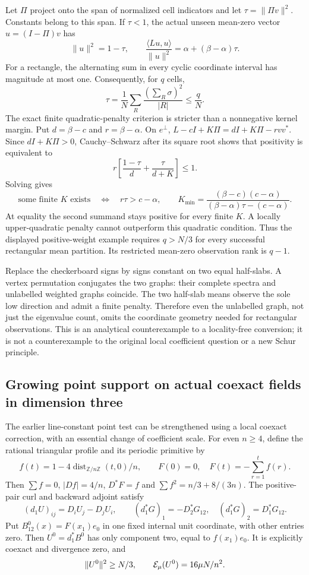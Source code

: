 Let $\Pi$ project onto the span of normalized cell indicators and let
$\tau=\|\Pi v\|^2$. Constants belong to this span. If $\tau<1$, the actual
unseen mean-zero vector $u=(I-\Pi)v$ has
\[
 \|u\|^2=1-\tau,\qquad
 \frac{\langle Lu,u\rangle}{\|u\|^2}
       =\alpha+(\beta-\alpha)\tau.
\]
For a rectangle, the alternating sum in every cyclic coordinate interval
has magnitude at most one. Consequently, for $q$ cells,
\[
 \tau=\frac1N\sum_R\frac{(\sum_R\sigma)^2}{|R|}\leq\frac qN.
\]
The exact finite quadratic-penalty criterion is stricter than a nonnegative
kernel margin. Put $d=\beta-c$ and $r=\beta-\alpha$. On $e^\perp$,
$L-cI+K\Pi=dI+K\Pi-rvv^*$. Since $dI+K\Pi>0$, Cauchy--Schwarz after
its square root shows that positivity is equivalent to
\[
 r\left[\frac{1-\tau}{d}+\frac\tau{d+K}\right]\leq1.
\]
Solving gives
\[
 \text{some finite }K\text{ exists}\quad\Longleftrightarrow\quad
 r\tau>c-\alpha,
 \qquad
 K_{\min}=\frac{(\beta-c)(c-\alpha)}{(\beta-\alpha)\tau-(c-\alpha)}.
\]
At equality the second summand stays positive for every finite $K$.
A locally upper-quadratic penalty cannot outperform this quadratic
condition. Thus the displayed positive-weight example requires $q>N/3$
for every successful rectangular mean partition. Its restricted mean-zero
observation rank is $q-1$.

Replace the checkerboard signs by signs constant on two equal half-slabs.
A vertex permutation conjugates the two graphs: their complete spectra
and unlabelled weighted graphs coincide. The two half-slab means observe
the sole low direction and admit a finite penalty. Therefore even the
unlabelled graph, not just the eigenvalue count, omits the coordinate
geometry needed for rectangular observations. This is an analytical
counterexample to a locality-free conversion; it is not a counterexample
to the original local coefficient question or a new Schur principle.

\subsection{Growing point support on actual coexact fields in dimension three}
The earlier line-constant point test can be strengthened using a local
coexact correction, with an essential change of coefficient scale.
For even $n\geq4$, define the rational triangular profile and its periodic
primitive by
\[
 f(t)=1-4\operatorname{dist}_{\mathbb Z/n\mathbb Z}(t,0)/n,
 \qquad F(0)=0,\quad F(t)=-\sum_{r=1}^t f(r).
\]
Then $\sum f=0$, $|D f|=4/n$, $D^*F=f$ and
$\sum f^2=n/3+8/(3n)$. The positive-pair curl and backward adjoint satisfy
\[
 (d_1U)_{ij}=D_iU_j-D_jU_i,\qquad
 (d_1^*G)_1=-D_2^*G_{12},\quad (d_1^*G)_2=D_1^*G_{12}.
\]
Put $B^0_{12}(x)=F(x_1)e_0$ in one fixed internal unit coordinate, with
other entries zero. Then $U^0=d_1^*B^0$ has only component two, equal to
$f(x_1)e_0$. It is explicitly coexact and divergence zero, and
\[
 \|U^0\|^2\geq N/3,\qquad \mathcal E_\mu(U^0)=16\mu N/n^2.
\]

